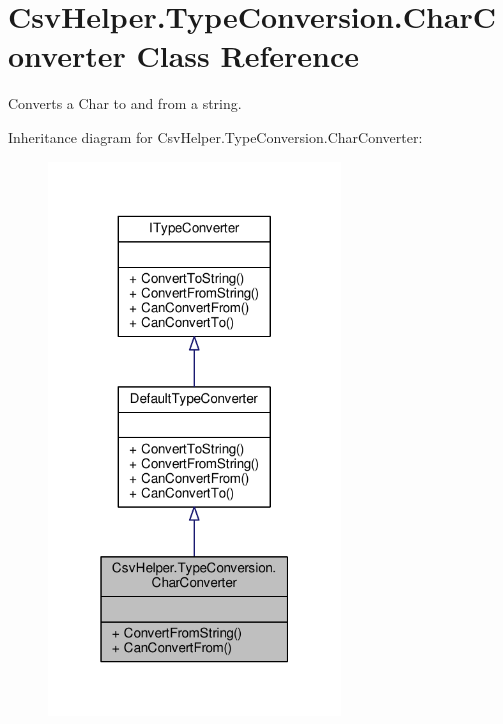 \hypertarget{a00050}{\section{Csv\-Helper.\-Type\-Conversion.\-Char\-Converter Class Reference}
\label{a00050}
}


Converts a Char to and from a string.  




Inheritance diagram for Csv\-Helper.\-Type\-Conversion.\-Char\-Converter\-:
\nopagebreak
\begin{figure}[H]
\begin{center}
\leavevmode
\includegraphics[width=220pt]{a00518}
\end{center}
\end{figure}


